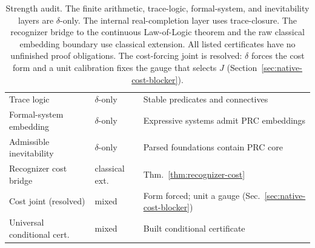 \documentclass[11pt,a4paper]{article}
\theoremstyle{definition}
\theoremstyle{remark}
\begin{document}
\begin{table}[ht]
\begin{tabular}{lll}
Trace logic              & $\delta$-only & Stable predicates and connectives \\
Formal-system embedding  & $\delta$-only & Expressive systems admit PRC embeddings \\
Admissible inevitability & $\delta$-only & Parsed foundations contain PRC core \\
Recognizer cost bridge   & classical ext. & Thm.~\ref{thm:recognizer-cost} \\
Cost joint (resolved)    & mixed & Form forced; unit a gauge (Sec.~\ref{sec:native-cost-blocker}) \\
Universal conditional cert. & mixed & Built conditional certificate \\
\bottomrule
\end{tabular}
\caption{Strength audit. The finite arithmetic, trace-logic, formal-system,
and inevitability layers are $\delta$-only. The internal
real-completion layer uses trace-closure. The recognizer bridge to the
continuous Law-of-Logic theorem and the raw classical embedding boundary use
classical extension. All listed certificates have no unfinished proof
obligations. The cost-forcing joint is resolved: $\delta$ forces the cost form
and a unit calibration fixes the gauge that selects $J$
(Section~\ref{sec:native-cost-blocker}).}
\label{tab:audit}
\end{table}
\end{document}
